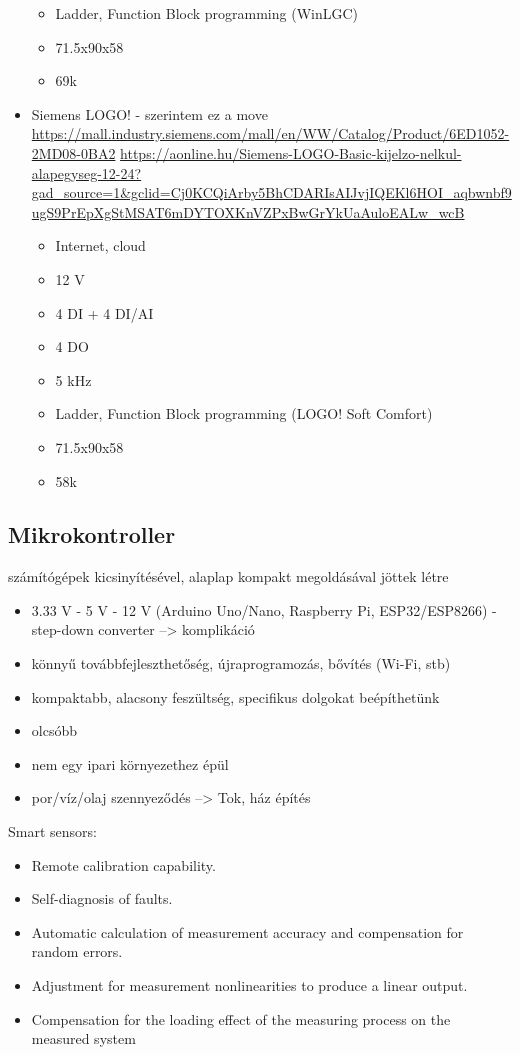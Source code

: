 \documentclass{article}
\begin{document}
\begin{itemize}
\begin{itemize}
				\item Ladder, Function Block programming (WinLGC)
				\item 71.5x90x58
				\item 69k
			\end{itemize}
		\item Siemens LOGO! - szerintem ez a move
			\url{https://mall.industry.siemens.com/mall/en/WW/Catalog/Product/6ED1052-2MD08-0BA2}
			\url{https://aonline.hu/Siemens-LOGO-Basic-kijelzo-nelkul-alapegyseg-12-24?gad_source=1&gclid=Cj0KCQiArby5BhCDARIsAIJvjIQEKl6HOI_aqbwnbf9ugS9PrEpXgStMSAT6mDYTOXKnVZPxBwGrYkUaAuloEALw_wcB}
			\begin{itemize}
				\item Internet, cloud
				\item 12 V
				\item 4 DI + 4 DI/AI
				\item 4 DO
				\item 5 kHz
				\item Ladder, Function Block programming (LOGO! Soft Comfort)
				\item 71.5x90x58
				\item 58k
			\end{itemize}
	\end{itemize}
	
	
	\subsection{Mikrokontroller}
	
	számítógépek kicsinyítésével, alaplap kompakt megoldásával jöttek létre
	
	\begin{itemize}
		\item 3.33 V - 5 V - 12 V (Arduino Uno/Nano, Raspberry Pi, ESP32/ESP8266) - step-down converter --> komplikáció
		\item könnyű továbbfejleszthetőség, újraprogramozás, bővítés (Wi-Fi, stb)
		\item kompaktabb, alacsony feszültség, specifikus dolgokat beépíthetünk
		\item olcsóbb
		\item nem egy ipari környezethez épül
		\item por/víz/olaj szennyeződés --> Tok, ház építés
	\end{itemize}
	
	
	
	Smart sensors:
	\begin{itemize}
		\item Remote calibration capability.
		\item Self-diagnosis of faults.
		\item Automatic calculation of measurement accuracy and compensation for random errors.
		\item Adjustment for measurement nonlinearities to produce a linear output.
		\item Compensation for the loading effect of the measuring process on the measured system
	\end{itemize}
	
\end{document}
